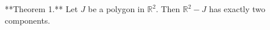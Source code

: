 **Theorem 1.** Let $J$ be a polygon in $\mathbb{R}^2$. Then $\mathbb{R}^2 - J$ has exactly two components.
